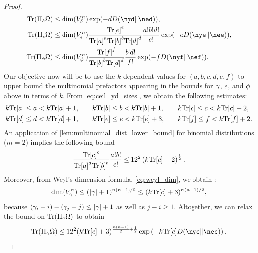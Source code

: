 \documentclass[notitlepage, 10pt]{article}
\begin{document}
\begin{proof}
\begin{align}
\begin{split}
            \Tr(\Pi_{\yd} \Omega)
            &\leq \dim(V_{\yd}^{n}) \exp(- d \kl{\nyd}{\ned}), \\
            \Tr(\Pi_{\ye} \Omega)
            &\leq \dim(V_{\ye}^{n})\frac{{\tee}^{e}}{{\tea}^{a}{\teb}^{b}{\ted}^{d}}\frac{a!b!d!}{e!} \exp(- e \kl{\nye}{\nee}), \\
            \Tr(\Pi_{\yf} \Omega)
            &\leq \dim(V_{\yf}^{n}) \frac{{\tef}^{f}}{{\teb}^{b}{\ted}^{d}}\frac{b!d!}{f!} \exp(- f \kl{\nyf}{\nef}).
        \end{split}
    \end{align}
    Our objective now will be to use the $k$-dependent values for $(a,b,c,d,e,f)$ to upper bound the multinomial prefactors appearing in the bounds for $\gamma$, $\epsilon$, and $\phi$ above in terms of $k$.
    From \cref{eq:ceil_yd_sizes}, we obtain the following estimates:
    \begin{equation}
        \label{eq:size_estimates}
        \begin{alignedat}{3}
            &k {\operatorname{Tr}[a]} \leq a < k {\operatorname{Tr}[a]} + 1, \qquad
            &&k {\operatorname{Tr}[b]} \leq b < k {\operatorname{Tr}[b]} + 1, \qquad
            &&k {\operatorname{Tr}[c]} \leq c < k {\operatorname{Tr}[c]} + 2, \\
            &k {\operatorname{Tr}[d]} \leq d < k {\operatorname{Tr}[d]} + 1, \qquad
            &&k {\operatorname{Tr}[e]} \leq e < k {\operatorname{Tr}[e]} + 3, \qquad
            &&k {\operatorname{Tr}[f]} \leq f < k {\operatorname{Tr}[f]} + 2.
        \end{alignedat}
    \end{equation}
    An application of \cref{lem:multinomial_dist_lower_bound} for binomial distributions ($m=2$) implies the following bound
    \begin{equation}
        \frac{{\operatorname{Tr}[c]}^{c}}{{\operatorname{Tr}[a]}^{a}{\operatorname{Tr}[b]}^{b}}\frac{a!b!}{c!}
        \leq 12^{2}\left(k {\operatorname{Tr}[c]}+2\right)^\frac{1}{2}.
    \end{equation}
    Moreover, from Weyl's dimension formula, \cref{eq:weyl_dim}, we obtain \cite[Equation 7]{christandl2006spectra}:
    \begin{equation}
        \dim(V_{\gamma}^{n}) \leq ({|\gamma|}+1)^{n(n-1)/2} \leq (k{\operatorname{Tr}[c]}+3)^{n(n-1)/2},
    \end{equation}
    because $(\gamma_i - i)-(\gamma_j - j) \leq {|\gamma|} + 1$ as well as $j-i\geq 1$.
    Altogether, we can relax the bound on $\operatorname{Tr}(\Pi_{\gamma} \Omega)$ to obtain
    \begin{equation}
        \Tr(\Pi_{\yc} \Omega) \leq
        12^{2}(k{\tec}+3)^{\frac{n(n-1)}{2}+\frac{1}{2}}\exp\left(-k{\tec}\kl{\nyc}{\nec}\right).
    \end{equation}

\end{proof}
\end{document}
